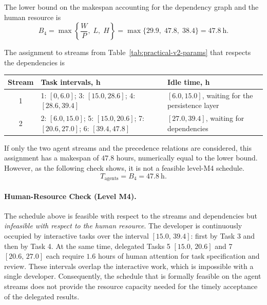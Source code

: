 The lower bound on the makespan accounting for the dependency graph and the
human resource is
\[
  B_4 = \max\left\{\frac{W}{P},\; L,\; H\right\} = \max\{29.9,\; 47.8,\; 38.4\} = 47.8~\text{h}.
\]

The assignment to streams from Table~\ref{tab:practical-v2-params} that
respects the dependencies is
\begin{center}
\small
\begin{tabularx}{\textwidth}{cXX}
\toprule
Stream & Task intervals, h & Idle time, h \\
\midrule
1 & 1: $[0,6.0]$; 3: $[15.0,28.6]$; 4: $[28.6,39.4]$ & $[6.0,15.0]$, waiting for the persistence layer \\
2 & 2: $[6.0,15.0]$; 5: $[15.0,20.6]$; 7: $[20.6,27.0]$; 6: $[39.4,47.8]$ & $[27.0,39.4]$, waiting for dependencies \\
\bottomrule
\end{tabularx}
\end{center}

If only the two agent streams and the precedence relations are considered,
this assignment has a makespan of $47.8$ hours, numerically equal to the lower
bound. However, as the following check shows, it is not a feasible level-M4
schedule.
\[
  T_{\mathrm{agents}}=B_4=47.8~\text{h}.
\]

\paragraph{Human-Resource Check (Level M4).}
The schedule above is feasible with respect to the streams and dependencies
but \emph{infeasible with respect to the human resource}. The developer is
continuously occupied by interactive tasks over the interval
$[15.0,\,39.4]$: first by Task 3 and then by Task 4. At the same time, delegated
Tasks 5 $[15.0,\,20.6]$ and 7 $[20.6,\,27.0]$ each require $1.6$ hours of human
attention for task specification and review. These intervals overlap the
interactive work, which is impossible with a single developer. Consequently,
the schedule that is formally feasible on the agent streams does not provide
the resource capacity needed for the timely acceptance of the delegated
results.

